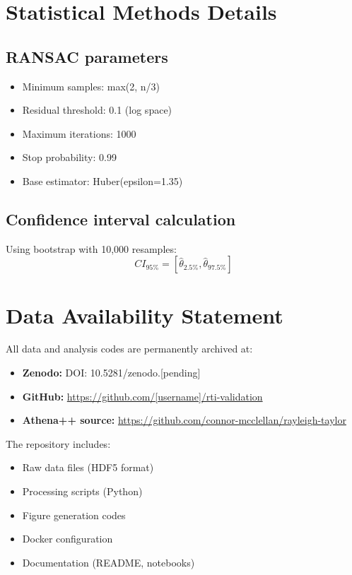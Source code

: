 \documentclass[aps,pre,twocolumn,superscriptaddress]{revtex4-2}
\begin{document}
\section{Statistical Methods Details}

\subsection{RANSAC parameters}

\begin{itemize}
\item Minimum samples: max(2, n/3)
\item Residual threshold: 0.1 (log space)
\item Maximum iterations: 1000
\item Stop probability: 0.99
\item Base estimator: Huber(epsilon=1.35)
\end{itemize}

\subsection{Confidence interval calculation}

Using bootstrap with 10,000 resamples:
\begin{equation}
CI_{95\%} = [\hat{\theta}_{2.5\%}, \hat{\theta}_{97.5\%}]
\end{equation}

\section{Data Availability Statement}

All data and analysis codes are permanently archived at:

\begin{itemize}
\item \textbf{Zenodo:} DOI: 10.5281/zenodo.[pending]
\item \textbf{GitHub:} \url{https://github.com/[username]/rti-validation}
\item \textbf{Athena++ source:} \url{https://github.com/connor-mcclellan/rayleigh-taylor}
\end{itemize}

The repository includes:
\begin{itemize}
\item Raw data files (HDF5 format)
\item Processing scripts (Python)
\item Figure generation codes
\item Docker configuration
\item Documentation (README, notebooks)
\end{itemize}
\end{document}
